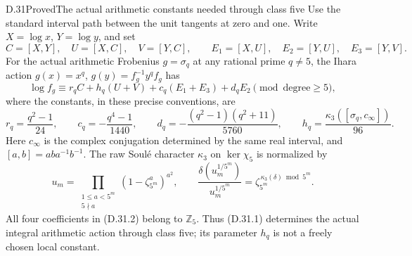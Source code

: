 \begin{statement}{D.31}{Proved}{The actual arithmetic constants needed through class five}
Use the standard interval path between the unit
tangents at zero and one. Write
\(X=\log x\), \(Y=\log y\), and set
\[
 C=[X,Y],\quad U=[X,C],\quad V=[Y,C],\qquad
 E_1=[X,U],\quad E_2=[Y,U],\quad E_3=[Y,V].
\]
For the actual arithmetic Frobenius \(g=\sigma_q\)
at any rational prime \(q\ne5\), the Ihara action
\(g(x)=x^q\), \(g(y)=f_g^{-1}y^qf_g\) has
\[
 \log f_g\equiv r_qC+h_q(U+V)
             +c_q(E_1+E_3)+d_qE_2\pmod{\text{degree}\ge5},
                                                        \tag{D.31.1}
\]
where the constants, in these precise conventions, are
\[
 r_q=\frac{q^2-1}{24},\qquad
 c_q=-\frac{q^4-1}{1440},\qquad
 d_q=-\frac{(q^2-1)(q^2+11)}{5760},\qquad
 h_q=\frac{\kappa_3([\sigma_q,c_\infty])}{96}.
                                                        \tag{D.31.2}
\]
Here \(c_\infty\) is the complex conjugation
determined by the same real interval, and
\([a,b]=aba^{-1}b^{-1}\). The raw Soul\'e character
\(\kappa_3\) on \(\ker\chi_5\) is normalized by
\[
 u_m=\prod_{\substack{1\le a<5^m\\5\nmid a}}
                  (1-\zeta_{5^m}^{a})^{a^2},\qquad
 \frac{\delta(u_m^{1/5^m})}{u_m^{1/5^m}}
       =\zeta_{5^m}^{\,\kappa_3(\delta)\bmod5^m}.
                                                        \tag{D.31.3}
\]
All four coefficients in (D.31.2) belong to
\(\mathbb Z_5\). Thus (D.31.1) determines the
actual integral arithmetic action through class
five; its parameter \(h_q\) is not a freely
chosen local constant.
\end{statement}

